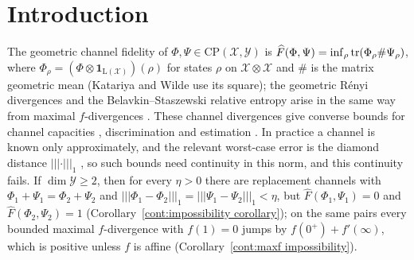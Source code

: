 \section{Introduction}\label{cont:sec:intro}

The geometric channel fidelity of $\Phi,\Psi\in\mathrm{CP}(\mathcal{X},\mathcal{Y})$ is $\widehat{F}(\Phi,\Psi)=\inf_{\rho}\operatorname{tr}(\Phi_\rho\#\Psi_\rho)$, where $\Phi_\rho=(\Phi\otimes\mathbf{1}_{\mathrm{L}(\mathcal{X})})(\rho)$ for states $\rho$ on $\mathcal{X}\otimes\mathcal{X}$ and $\#$ is the matrix geometric mean (Katariya and Wilde \cite{KatariyaWilde2021} use its square); the geometric R\'enyi divergences and the Belavkin--Staszewski relative entropy arise in the same way from maximal $f$-divergences \cite{Matsumoto2018newf}. These channel divergences give converse bounds for channel capacities \cite{FangFawzi2021}, discrimination and estimation \cite{KatariyaWilde2021}. In practice a channel is known only approximately, and the relevant worst-case error is the diamond distance $|||\cdot|||_1$ \cite{KuengLongDohertyFlammia2016}, so such bounds need continuity in this norm, and this continuity fails. If $\dim\mathcal{Y}\geq2$, then for every $\eta>0$ there are replacement channels with $\Phi_1+\Psi_1=\Phi_2+\Psi_2$ and $|||\Phi_1-\Phi_2|||_1=|||\Psi_1-\Psi_2|||_1<\eta$, but $\widehat{F}(\Phi_1,\Psi_1)=0$ and $\widehat{F}(\Phi_2,\Psi_2)=1$ (Corollary~\ref{cont:impossibility corollary}); on the same pairs every bounded maximal $f$-divergence with $f(1)=0$ jumps by $f(0^+)+f'(\infty)$, which is positive unless $f$ is affine (Corollary~\ref{cont:maxf impossibility}).

